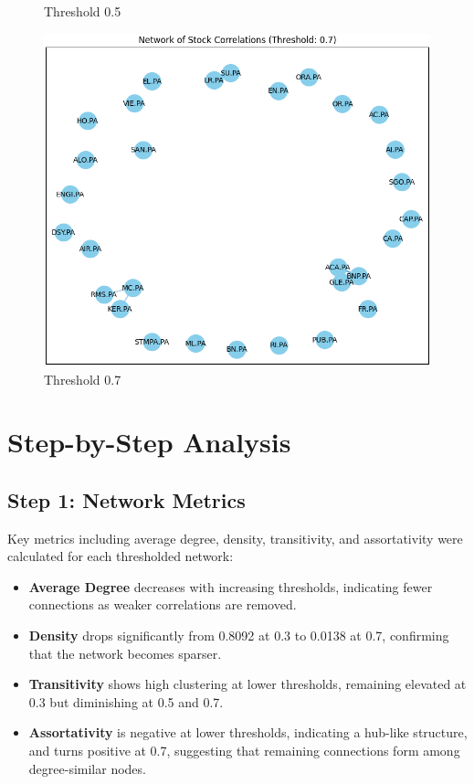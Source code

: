 \documentclass[12pt]{article}
\begin{document}
\begin{figure}[h!]
\begin{minipage}[b]{0.32\textwidth}
      \caption{Threshold 0.5}
      \label{fig:threshold05}
  \end{minipage}
  \hfill
  \begin{minipage}[b]{0.32\textwidth}
      \includegraphics[width=\textwidth]{2D_network_stock_corr7.png}
      \caption{Threshold 0.7}
      \label{fig:threshold07}
  \end{minipage}
  \label{fig:stock_networks}
\end{figure}

\section{Step-by-Step Analysis}

\subsection{Step 1: Network Metrics}
Key metrics including average degree, density, transitivity, and assortativity were calculated for each thresholded network:
\begin{itemize}
    \item \textbf{Average Degree} decreases with increasing thresholds, indicating fewer connections as weaker correlations are removed.
    \item \textbf{Density} drops significantly from 0.8092 at 0.3 to 0.0138 at 0.7, confirming that the network becomes sparser.
    \item \textbf{Transitivity} shows high clustering at lower thresholds, remaining elevated at 0.3 but diminishing at 0.5 and 0.7.
    \item \textbf{Assortativity} is negative at lower thresholds, indicating a hub-like structure, and turns positive at 0.7, suggesting that remaining connections form among degree-similar nodes.
\end{itemize}
\end{document}
